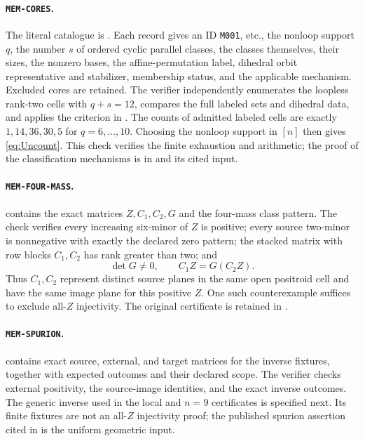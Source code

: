 \documentclass[11pt]{article}
\newcommand{\1}{\mathbf 1}
\begin{document}
\paragraph{\texttt{MEM-CORES}.}
The literal catalogue is .
Each record gives an ID \texttt{M001}, etc., the nonloop support $q$, the
number $s$ of ordered cyclic parallel classes, the classes themselves,
their sizes, the nonzero bases, the affine-permutation label, dihedral
orbit representative and stabilizer, membership status, and the applicable
mechanism.  Excluded cores are retained.  The verifier independently
enumerates the loopless rank-two cells with $q+s=12$, compares the full
labeled sets and dihedral data, and applies the criterion in
.  The counts of admitted labeled cells are exactly
$1,14,36,30,5$ for $q=6,\dots,10$.  Choosing the nonloop support in
$[n]$ then gives \eqref{eq:Uncount}.  This check verifies the finite
exhaustion and arithmetic; the proof of the classification mechanisms is
in  and its cited input.

\paragraph{\texttt{MEM-FOUR-MASS}.}
 contains the exact matrices
$Z,C_1,C_2,G$ and the four-mass class pattern.  The check verifies every
increasing six-minor of $Z$ is positive; every source two-minor is
nonnegative with exactly the declared zero pattern; the stacked matrix
with row blocks $C_1,C_2$ has rank greater than two; and
\[
\det G\ne0,\qquad C_1Z=G(C_2Z).
\]
Thus $C_1,C_2$ represent distinct source planes in the same open positroid
cell and have the same image plane for this positive $Z$.  One such
counterexample suffices to exclude all-$Z$ injectivity.  The original
certificate is retained in
.

\paragraph{\texttt{MEM-SPURION}.}
 contains exact source,
external, and target matrices for the inverse fixtures, together with
expected outcomes and their declared scope.  The verifier checks external
positivity, the source-image identities, and the exact inverse outcomes.
The generic inverse used in the local and $n=9$ certificates is specified
next.  Its finite fixtures are not an all-$Z$ injectivity proof; the
published spurion assertion cited in  is the uniform
geometric input.
\end{document}
